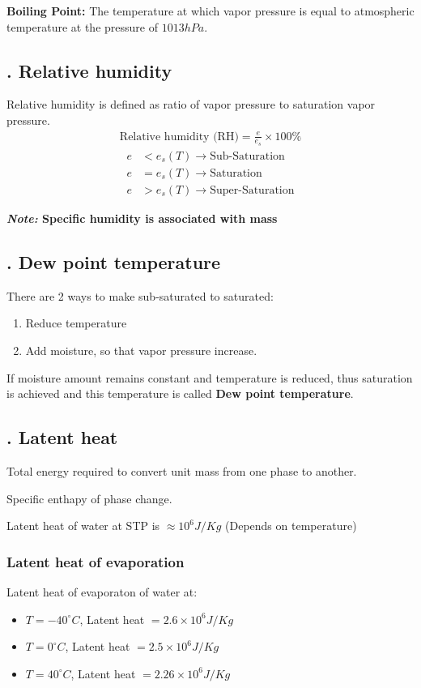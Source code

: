 \documentclass[fleqn,10pt]{SelfArx} %
\begin{document}
\textbf{Boiling Point:} The temperature at which vapor pressure is equal to atmospheric temperature at the pressure of $1013 hPa$.

\subsection{. Relative humidity}
Relative humidity is defined as ratio of vapor pressure to saturation vapor pressure.
\begin{align}
    \text{Relative humidity (RH)} = \frac{e}{e_s} \times 100\%
\end{align}
\begin{align}
    e &< e_s(T) \rightarrow \text{Sub-Saturation} \\
    e &= e_s(T) \rightarrow \text{Saturation} \\
    e &> e_s(T) \rightarrow \text{Super-Saturation}
\end{align}

\textbf{\textit{Note:} Specific humidity is associated with mass}

\subsection{. Dew point temperature}
There are 2 ways to make sub-saturated to saturated:
\begin{enumerate}[noitemsep]
    \item Reduce temperature
    \item Add moisture, so that vapor pressure increase.
\end{enumerate}

If moisture amount remains constant and temperature is reduced, thus saturation is achieved and this temperature is called \textbf{Dew point temperature}.

\subsection{. Latent heat}
Total energy required to convert unit mass from one phase to another.

Specific enthapy of phase change.

Latent heat of water at STP is $\approx 10^6 J/Kg$ (Depends on temperature)

\subsubsection*{Latent heat of evaporation}
Latent heat of evaporaton of water at:
\begin{itemize}[noitemsep]
    \item $T=-40^\circ C$, \quad Latent heat $=2.6 \times 10^6J/Kg$ 
    \item $T=0^\circ C$, \quad Latent heat $=2.5 \times 10^6J/Kg$ 
    \item $T=40^\circ C$, \quad Latent heat $=2.26 \times 10^6J/Kg$ 
\end{itemize} 
\end{document}
